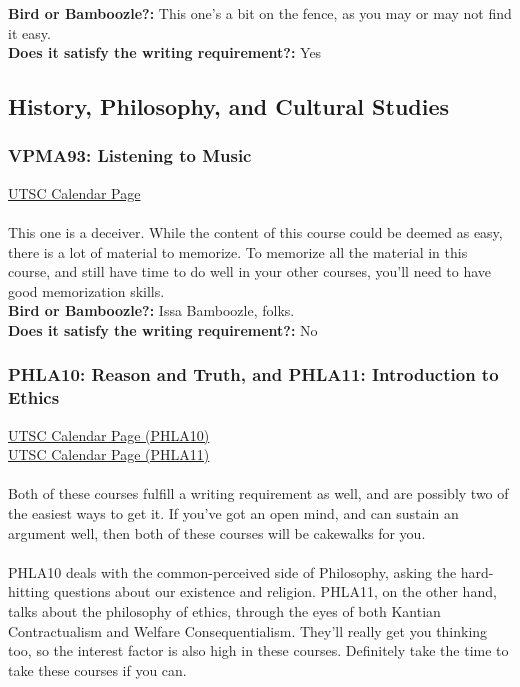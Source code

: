 \documentclass[11pt]{article}
\begin{document}
\textbf{Bird or Bamboozle?:} This one's a bit on the fence, as you may or may not find it easy.\\

\textbf{Does it satisfy the writing requirement?:} Yes

\subsection{History, Philosophy, and Cultural Studies}
\subsubsection{VPMA93: Listening to Music}

\href{https://utsc.calendar.utoronto.ca/course/VPMA93H3}{UTSC Calendar Page}\\\\
This one is a deceiver.  While the content of this course could be deemed as easy, there is a lot of material to memorize.  To memorize all the material in this course, and still have time to do well in your other courses, you'll need to have good memorization skills.\\

\textbf{Bird or Bamboozle?:} Issa Bamboozle, folks.\\

\textbf{Does it satisfy the writing requirement?:} No

\subsubsection{PHLA10: Reason and Truth, and PHLA11: Introduction to Ethics}
\href{https://utsc.calendar.utoronto.ca/course/PHLA10H3}{UTSC Calendar Page (PHLA10)}\\
\href{https://utsc.calendar.utoronto.ca/course/PHLA11H3}{UTSC Calendar Page (PHLA11)}\\\\
Both of these courses fulfill a writing requirement as well, and are possibly two of the easiest ways to get it.  If you've got an open mind, and can sustain an argument well, then both of these courses will be cakewalks for you.\\\\ 
PHLA10 deals with the common-perceived side of Philosophy, asking the hard-hitting questions about our existence and religion.  PHLA11, on the other hand, talks about the philosophy of ethics, through the eyes of both Kantian Contractualism and Welfare Consequentialism.  They'll really get you thinking too, so the interest factor is also high in these courses.  Definitely take the time to take these courses if you can.\\
\end{document}
